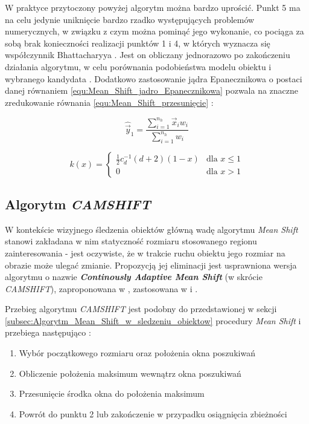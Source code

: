 W praktyce przytoczony powyżej algorytm można bardzo uprościć. Punkt 5 ma na celu jedynie uniknięcie bardzo rzadko występujących problemów numerycznych, w związku z czym można pominąć jego wykonanie, co pociąga za sobą brak konieczności realizacji punktów 1 i 4, w których wyznacza się współczynnik Bhattacharyya \cite{Comaniciu2003}. Jest on obliczany jednorazowo po zakończeniu działania algorytmu, w celu porównania podobieństwa modelu obiektu i wybranego kandydata \cite{Comaniciu2003}. Dodatkowo zastosowanie jądra Epanecznikowa o postaci danej równaniem \ref{equ:Mean_Shift_jadro_Epanecznikowa} pozwala na znaczne zredukowanie równania \ref{equ:Mean_Shift_przesunięcie} \cite{Comaniciu2003}:

\begin{equation}
\label{equ:Mean_Shift_przesunięcie_zredukowane}
	\hat{\vec{y}}_1 = \frac{\sum_{i=1}^{n_h}\vec{x}_i w_i}{\sum_{i=1}^{n_h} w_i}
\end{equation}

\begin{equation}
\label{equ:Mean_Shift_jadro_Epanecznikowa}
	k(x) = 
	\begin{cases}
		\frac{1}{2}c_d^{-1}(d+2)(1-x) & \text{dla } x \leq 1 \\
		0 & \text{dla } x > 1
	\end{cases}
\end{equation}

\subsection{Algorytm \textit{CAMSHIFT}}
\label{subsec:Algorytm_CAMSHIFT}

W kontekście wizyjnego śledzenia obiektów główną wadę algorytmu \textit{Mean Shift} stanowi zakładana w nim statyczność rozmiaru stosowanego regionu zainteresowania - jest oczywiste, że w trakcie ruchu obiektu jego rozmiar na obrazie może ulegać zmianie. Propozycją jej eliminacji jest usprawniona wersja algorytmu o nazwie \textbf{\textit{Continously Adaptive Mean Shift}} (w skrócie \textit{CAMSHIFT}), zaproponowana w \cite{Bradski1998}, zastosowana w \cite{Li2009} i \cite{Zhang2011}.

Przebieg algorytmu \textit{CAMSHIFT} jest podobny do przedstawionej w sekcji \ref{subsec:Algorytm_Mean_Shift_w_sledzeniu_obiektow} procedury \textit{Mean Shift} i przebiega następująco \cite{Bradski1998}:

\begin{enumerate}
	\item Wybór początkowego rozmiaru oraz położenia okna poszukiwań
	\item Obliczenie położenia maksimum wewnątrz okna poszukiwań
	\item Przesunięcie środka okna do położenia maksimum
	\item Powrót do punktu 2 lub zakończenie w przypadku osiągnięcia zbieżności
\end{enumerate}

